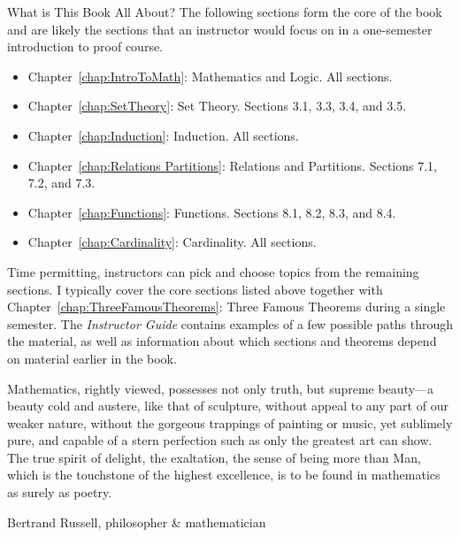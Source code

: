 \begin{section}{What is This Book All About?}
The following sections form the core of the book and are likely the sections that an instructor would focus on in a one-semester introduction to proof course.
\begin{itemize}
\item Chapter~\ref{chap:IntroToMath}: Mathematics and Logic. All sections.
\item Chapter~\ref{chap:SetTheory}: Set Theory. Sections 3.1, 3.3, 3.4, and 3.5.
\item Chapter~\ref{chap:Induction}: Induction. All sections.
\item Chapter~\ref{chap:Relations Partitions}: Relations and Partitions. Sections 7.1, 7.2, and 7.3.
\item Chapter~\ref{chap:Functions}: Functions. Sections 8.1, 8.2, 8.3, and 8.4.
\item Chapter~\ref{chap:Cardinality}: Cardinality. All sections.
\end{itemize}
Time permitting, instructors can pick and choose topics from the remaining sections.  I typically cover the core sections listed above together with Chapter~\ref{chap:ThreeFamousTheorems}: Three Famous Theorems during a single semester. The \emph{Instructor Guide} contains examples of a few possible paths through the material, as well as information about which sections and theorems depend on material earlier in the book.

\epigraph{Mathematics, rightly viewed, possesses not only truth, but supreme beauty---a beauty cold and austere, like that of sculpture, without appeal to any part of our weaker nature, without the gorgeous trappings of painting or music, yet sublimely pure, and capable of a stern perfection such as only the greatest art can show. The true spirit of delight, the exaltation, the sense of being more than Man, which is the touchstone of the highest excellence, is to be found in mathematics as surely as poetry.}{Bertrand Russell, philosopher \& mathematician}

\end{section}

